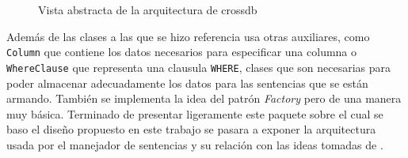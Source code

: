 \begin{figure}
  \centering
   \label{fig:subfig:crossdb:base-idea}
  \qquad 
   \label{fig:subfig:crossdb:base-idea-select}
  \caption{Vista abstracta de la arquitectura de crossdb}
  \label{fig:crossdb:base-idea}
\end{figure}

Además de las clases a las que se hizo referencia \cc usa otras auxiliares, como \verb=Column= que contiene los datos necesarios para especificar una columna o \verb=WhereClause= que representa una clausula \verb=WHERE=, clases que son necesarias para poder almacenar adecuadamente los datos para las sentencias que se están armando. También se implementa la idea del patrón \textit{Factory} pero de una manera muy básica. Terminado de presentar ligeramente este paquete sobre el cual se baso el diseño propuesto en este trabajo se pasara a exponer la arquitectura usada por el manejador de sentencias y su relación con las ideas tomadas de \cc.
%
